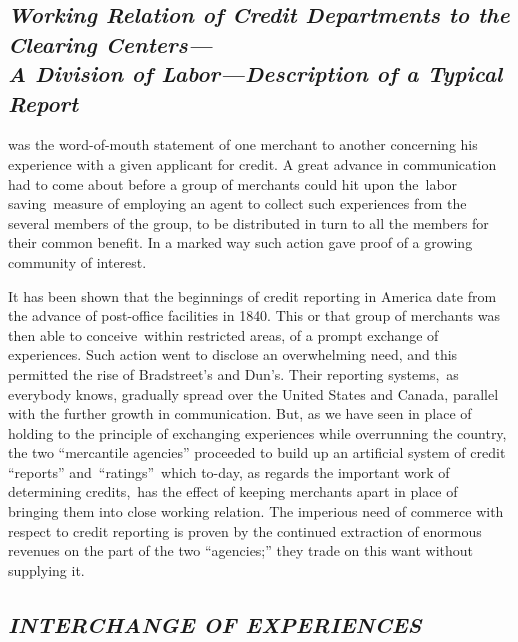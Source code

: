 \documentclass[twoside,symmetric,nobib,justified]{tufte-book}
\begin{document}
\hypertarget{working-relation-of-credit-departments-to-the-clearing-centersa-division-of-labordescription-of-a-typical-report}{%
\subsection{\texorpdfstring{\emph{Working Relation of Credit
Departments to the Clearing Centers---\\\noindent A Division of Labor---Description
of a Typical
Report}}{Working Relation of Credit Departments to the Clearing Centers--- A Division of Labor---Description of a Typical Report}}\label{working-relation-of-credit-departments-to-the-clearing-centersa-division-of-labordescription-of-a-typical-report}}

 was the word-of-mouth statement of one merchant
to another concerning his experience with a given applicant for credit.
A great advance in communication had to come about before a group of
merchants could hit upon the~labor saving~measure of employing an agent
to collect such experiences from the several members of the group, to be
distributed in turn to all the members for their common benefit. In a
marked way such action gave proof of a growing community of interest.~

It has been shown that the beginnings of credit reporting in America
date from the advance of post-office facilities in 1840. This or that
group of merchants was then able to conceive~within restricted areas, of
a prompt exchange of experiences. Such action went to disclose an
overwhelming need, and this permitted the rise of Bradstreet's and
Dun's. Their reporting systems,~as everybody knows, gradually spread
over the United States and Canada, parallel with the further growth in
communication. But, as we have seen in place of holding to the principle
of exchanging experiences while overrunning the country, the two
``mercantile agencies'' proceeded to build up an artificial system of
credit ``reports'' and~``ratings''~which to-day, as regards the
important work of determining credits,~has the effect of keeping
merchants apart in place of bringing them into close working relation.
The imperious need of commerce with respect to credit reporting is
proven by the continued extraction of enormous revenues on the part of
the two ``agencies;'' they trade on this want without supplying it.~

\hypertarget{interchange-of-experiences}{%
\subsection{\texorpdfstring{\emph{INTERCHANGE OF
EXPERIENCES}}{INTERCHANGE OF EXPERIENCES}}\label{interchange-of-experiences}}
\end{document}
